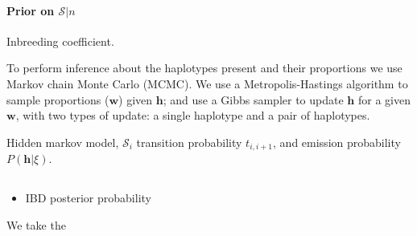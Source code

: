 \documentclass{article}
\begin{document}
\paragraph{Prior on $\mathcal{S}|n$}

Inbreeding coefficient.


To perform inference about the haplotypes present and their proportions we use Markov chain Monte Carlo (MCMC). We use a Metropolis-Hastings algorithm to sample proportions ($\mathbf w$) given $\mathbf h$; and use a Gibbs sampler to update $\mathbf h$ for a given $\mathbf w$, with two types of update: a single haplotype and a pair of haplotypes.


Hidden markov model, $\mathcal{S}_{i}$ transition probability $t_{i, i+1}$, and emission probability $P(\mathbf{h} | \xi)$.


\subsection{}
\begin{itemize}
  \item IBD posterior probability

\end{itemize}

We take the
\end{document}
